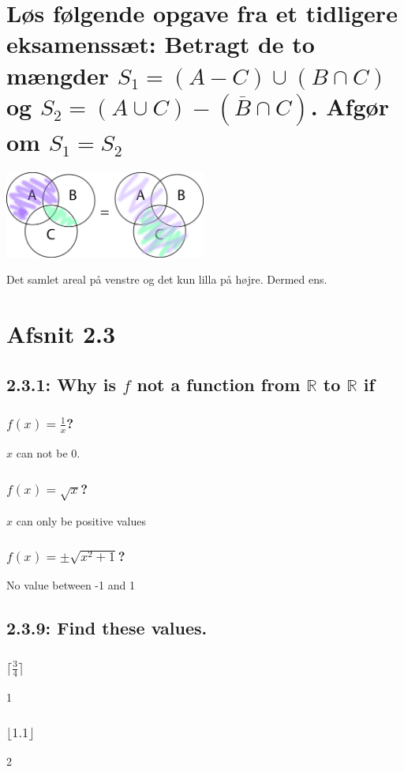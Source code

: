 \documentclass[12pt, a4paper]{report}
\begin{document}
			\section{Løs følgende opgave fra et tidligere eksamenssæt: Betragt de to mængder $S_1=(A-C)\cup (B\cap C)$ og $S_2=(A\cup C) -(\overline{B}\cap C)$. Afgør om $S_1=S_2$}
				\begin{center}
					\includegraphics[width=250px]{assets/2.26.png}
				\end{center}
				Det samlet areal på venstre og det kun lilla på højre. Dermed ens.
			\setcounter{section}{0}
			\section{Afsnit 2.3}
				\setcounter{subsection}{0}
				\subsection{2.3.1: Why is $f$ not a function from $\mathbb{R}$ to $\mathbb{R}$ if}
					\subsubsection{$f(x)=\frac{1}{x}$?}
						$x$ can not be 0.
					\subsubsection{$f(x)=\sqrt{x}$?}
						$x$ can only be positive values
					\subsubsection{$f(x)=\pm\sqrt{x^2+1}$?}
						No value between -1 and 1
				\setcounter{subsection}{8}
				\subsection{2.3.9: Find these values.}
					\subsubsection{$\lceil \frac{3}{4}\rceil$}
						1
					\subsubsection{$\lfloor 1.1 \rfloor$}
						2
\end{document}
